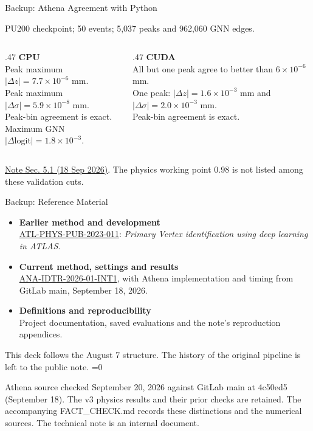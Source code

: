 \documentclass[xcolor=table,aspectratio=169]{beamer}
\providecommand{\talkbuild}{0}
\newcommand{\readingonly}[1]{\ifnum\talkbuild=0\relax#1\fi}
\newcommand{\readingnote}[1]{\readingonly{\par\vspace{.35em}%
  {\footnotesize\color{black!65}#1\par}}}
\newcommand{\takeaway}[1]{\par\vspace{.65em}{\centering
  \setlength{\fboxsep}{7pt}\colorbox{pennred!5}{\parbox{.94\linewidth}{%
  \centering\small\textcolor{pennred}{#1}}}\par}}
\newcommand{\context}[1]{{\centering\footnotesize\color{black!55}#1\par}\vspace{.65em}}
\newcommand{\pubnote}{\href{https://cds.cern.ch/record/2858348}{ATL-PHYS-PUB-2023-011}}
\newcommand{\notelink}{\href{https://gitlab.cern.ch/atlas-physics-office/IDTR/ANA-IDTR-2026-01/ANA-IDTR-2026-01-INT1}{ANA-IDTR-2026-01-INT1}}
\newcommand{\treysource}{\href{https://gitlab.cern.ch/atlas-physics-office/IDTR/ANA-IDTR-2026-01/ANA-IDTR-2026-01-INT1/-/blob/4c50ed51500c897dd6a1b5bb52b0f1e3c12e7575/sections/04b_timing.tex}{Note Sec. 5.1 (18 Sep 2026)}}
\begin{document}
\begin{frame}{Backup: Athena Agreement with Python}
\context{PU200 checkpoint; 50 events; 5,037 peaks and 962,060 GNN edges.}
\begin{columns}[t]
\begin{column}{.47\linewidth}\small
\textbf{CPU}\\[.8em]
Peak maximum $|\Delta z|=7.7\times10^{-6}$ mm.\\[.6em]
Peak maximum $|\Delta\sigma|=5.9\times10^{-8}$ mm.\\[.6em]
Peak-bin agreement is exact.\\[.6em]
Maximum GNN $|\Delta\mathrm{logit}|=1.8\times10^{-3}$.
\end{column}
\begin{column}{.47\linewidth}\small
\textbf{CUDA}\\[.8em]
All but one peak agree to better than $6\times10^{-6}$ mm.\\[.6em]
One peak: $|\Delta z|=1.6\times10^{-3}$ mm and $|\Delta\sigma|=2.0\times10^{-3}$ mm.\\[.6em]
Peak-bin agreement is exact.
\end{column}
\end{columns}
\takeaway{No edge decisions change on CPU or CUDA at the tested cuts: 0.5, 0.9, 0.99, 0.999.}
{\scriptsize\color{black!55}\treysource. The physics working point 0.98 is not listed among these validation cuts.}
\end{frame}

\begin{frame}{Backup: Reference Material}
\relax

\begin{itemize}\setlength\itemsep{1em}
\item \textbf{Earlier method and development}\\[.4em]
\pubnote: \emph{Primary Vertex identification using deep learning in ATLAS}.
\item \textbf{Current method, settings and results}\\[.4em]
\notelink, with Athena implementation and timing from GitLab main, September 18, 2026.
\item \textbf{Definitions and reproducibility}\\[.4em]
Project documentation, saved evaluations and the note's reproduction appendices.
\end{itemize}
\par\vspace{1em}\small
This deck follows the August 7 structure. The history of the original pipeline is left to the public note.
\readingnote{Athena source checked September 20, 2026 against GitLab main at 4c50ed5 (September 18). The v3 physics results and their prior checks are retained. The accompanying FACT\_CHECK.md records these distinctions and the numerical sources. The technical note is an internal document.}
\end{frame}
\end{document}

